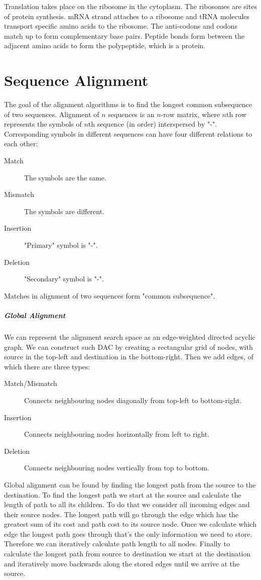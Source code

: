 \documentclass{report}
\begin{document}
Translation takes place on the ribosome in the cytoplasm.
The ribosomes are sites of protein synthesis.
mRNA strand attaches to a ribosome and tRNA molecules transport specific amino acids to the ribosome.
The anti-codons and codons match up to form complementary base pairs.
Peptide bonds form between the adjacent amino acids to form the polypeptide, which is a protein.

\chapter{Sequence Alignment}
The goal of the alignment algorithms is to find the longest common subsequence of two sequences.
Alignment of $n$ sequences is an $n\text{-row}$ matrix, where $n$th row represents the symbols of $n$th sequence (in order) interspersed by "-".
Corresponding symbols in different sequences can have four different relations to each other:
\begin{description}
\item[Match] The symbols are the same.
\item[Mismatch] The symbols are different.
\item[Insertion] "Primary" symbol is "-".
\item[Deletion] "Secondary" symbol is "-".
\end{description}
Matches in alignment of two sequences form "common subsequence".
\paragraph{Global Alignment}
We can represent the alignment search space as an edge-weighted directed acyclic graph.
We can construct such DAC by creating a rectangular grid of nodes, with source in the top-left and destination in the bottom-right.
Then we add edges, of which there are three types:
\begin{description}
\item[Match/Mismatch] Connects neighbouring nodes diagonally from top-left to bottom-right.
\item[Insertion] Connects neighbouring nodes horizontally from left to right.
\item[Deletion] Connects neighbouring nodes vertically from top to bottom.
\end{description}
Global alignment can be found by finding the longest path from the source to the destination.
To find the longest path we start at the source and calculate the length of path to all its children.
To do that we consider all incoming edges and their source nodes.
The longest path will go through the edge which has the greatest sum of its cost and path cost to its source node.
Once we calculate which edge the longest path goes through that's the only information we need to store.
Therefore we can iteratively calculate path length to all nodes.
Finally to calculate the longest path from source to destination we start at the destination and iteratively move backwards along the stored edges until we arrive at the source.
\end{document}
